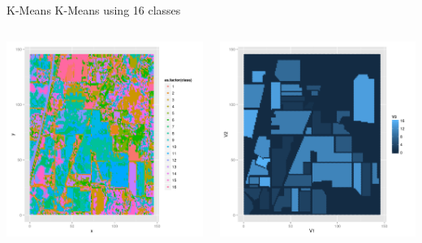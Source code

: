 \documentclass[11pt]{beamer}
\begin{document}
\begin{frame}{K-Means}
K-Means using 16 classes
\begin{columns}[T]
\begin{column}{.48\textwidth}
\includegraphics[scale=.3]{km16.png}
\end{column}
\hfill
\begin{column}{.48\textwidth}
\includegraphics[scale=.3]{gt.png}
\end{column}
\end{columns}
\end{frame}
\end{document}
